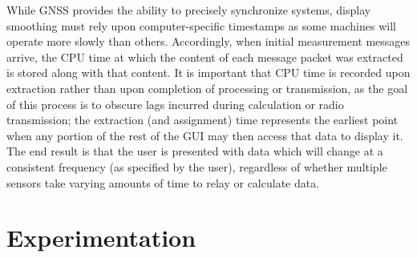 \documentclass[twocolumn,10pt]{article}
\begin{document}
    While GNSS provides the ability to precisely synchronize systems, display smoothing must rely upon computer-specific timestamps as some machines will operate more slowly than others. Accordingly, when initial measurement messages arrive, the CPU time at which the content of each message packet was extracted is stored along with that content. It is important that CPU time is recorded upon extraction rather than upon completion of processing or transmission, as the goal of this process is to obscure lags incurred during calculation or radio transmission; the extraction (and assignment) time represents the earliest point when any portion of the rest of the GUI may then access that data to display it. The end result is that the user is presented with data which will change at a consistent frequency (as specified by the user), regardless of whether multiple sensors take varying amounts of time to relay or calculate data.





\section*{Experimentation}
\end{document}
